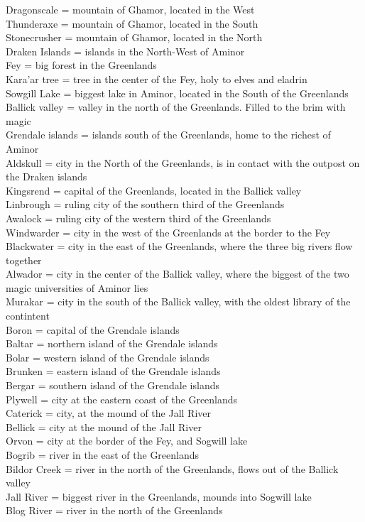 \documentclass[oneside]{book}
\begin{document}
	Dragonscale = mountain of Ghamor, located in the West\\
	Thunderaxe = mountain of Ghamor, located in the South\\
	Stonecrusher = mountain of Ghamor, located in the North\\
	Draken Islands = islands in the North-West of Aminor\\
	Fey = big forest in the Greenlands\\
	Kara'ar tree = tree in the center of the Fey, holy to elves and eladrin\\
	Sowgill Lake = biggest lake in Aminor, located in the South of the Greenlands\\
	Ballick valley = valley in the north of the Greenlands. Filled to the brim with magic\\
	Grendale islands = islands south of the Greenlands, home to the richest of Aminor\\
	Aldskull = city in the North of the Greenlands, is in contact with the outpost on the Draken islands\\
	Kingsrend = capital of the Greenlands, located in the Ballick valley\\
	Linbrough =  ruling city of the southern third of the Greenlands\\
	Awalock = ruling city of the western third of the Greenlands\\
	Windwarder = city in the west of the Greenlands at the border to the Fey\\
	Blackwater = city in the east of the Greenlands, where the three big rivers flow together\\
	Alwador = city in the center of the Ballick valley, where the biggest of the two magic universities of Aminor lies\\
	Murakar = city in the south of the Ballick valley, with the oldest library of the contintent\\
	Boron = capital of the Grendale islands\\
	Baltar = northern island of the Grendale islands\\
	Bolar = western island of the Grendale islands\\
	Brunken = eastern island of the Grendale islands\\
	Bergar = southern island of the Grendale islands\\
	Plywell = city at the eastern coast of the Greenlands\\
	Caterick = city, at the mound of the Jall River\\
	Bellick = city at the mound of the Jall River\\
	Orvon = city at the border of the Fey, and Sogwill lake\\
	Bogrib = river in the east of the Greenlands\\
	Bildor Creek = river in the north of the Greenlands, flows out of the Ballick valley\\
	Jall River = biggest river in the Greenlands, mounds into Sogwill lake\\
	Blog River = river in the north of the Greenlands\\
\end{document}
